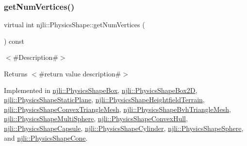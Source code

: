 \mbox{\label{classnjli_1_1_physics_shape_ac3f7cc28341fd58ace164bf8666480f0}} 
\subsubsection{\texorpdfstring{get\+Num\+Vertices()}{getNumVertices()}}
{\footnotesize\ttfamily virtual int njli\+::\+Physics\+Shape\+::get\+Num\+Vertices (\begin{DoxyParamCaption}{ }\end{DoxyParamCaption}) const\hspace{0.3cm}{\ttfamily [pure virtual]}}

$<$\#\+Description\#$>$

\begin{DoxyReturn}{Returns}
$<$\#return value description\#$>$ 
\end{DoxyReturn}


Implemented in \mbox{\hyperlink{classnjli_1_1_physics_shape_box_a36c3b4521b3559311f259e3c1bec1ff6}{njli\+::\+Physics\+Shape\+Box}}, \mbox{\hyperlink{classnjli_1_1_physics_shape_box2_d_ab6b86970a80827d5ea8620dbb080023f}{njli\+::\+Physics\+Shape\+Box2D}}, \mbox{\hyperlink{classnjli_1_1_physics_shape_static_plane_ab17422166a9a96672d671f8843c49f26}{njli\+::\+Physics\+Shape\+Static\+Plane}}, \mbox{\hyperlink{classnjli_1_1_physics_shape_heightfield_terrain_af6b7c8322826c83fc672b1ddc50d70fa}{njli\+::\+Physics\+Shape\+Heightfield\+Terrain}}, \mbox{\hyperlink{classnjli_1_1_physics_shape_convex_triangle_mesh_aef5d4654e20f1c128b350867c2ea8eb6}{njli\+::\+Physics\+Shape\+Convex\+Triangle\+Mesh}}, \mbox{\hyperlink{classnjli_1_1_physics_shape_bvh_triangle_mesh_af0263ac5341f2a8e560142a02aba7f34}{njli\+::\+Physics\+Shape\+Bvh\+Triangle\+Mesh}}, \mbox{\hyperlink{classnjli_1_1_physics_shape_multi_sphere_a8ffb7cb487afc5582cb4c1ae4997a065}{njli\+::\+Physics\+Shape\+Multi\+Sphere}}, \mbox{\hyperlink{classnjli_1_1_physics_shape_convex_hull_a14ad34853c7049de052a460fe1f349c2}{njli\+::\+Physics\+Shape\+Convex\+Hull}}, \mbox{\hyperlink{classnjli_1_1_physics_shape_capsule_af85b2258d5ab0b0ac1dbe88419c32fd9}{njli\+::\+Physics\+Shape\+Capsule}}, \mbox{\hyperlink{classnjli_1_1_physics_shape_cylinder_af865d6862f4dd8849f4b9290a3907337}{njli\+::\+Physics\+Shape\+Cylinder}}, \mbox{\hyperlink{classnjli_1_1_physics_shape_sphere_a9f7815a4e99feb1c2c0e62f6b7f0adbf}{njli\+::\+Physics\+Shape\+Sphere}}, and \mbox{\hyperlink{classnjli_1_1_physics_shape_cone_a7d37fd30a4ad7615fc17682d06824c11}{njli\+::\+Physics\+Shape\+Cone}}.

